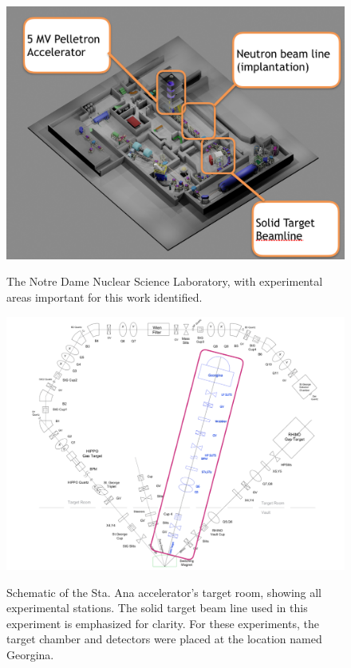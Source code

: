 \begin{figure}
\includegraphics[width=\linewidth]{figures/nslLab.png}
\label{fig: nsl}
\caption{The Notre Dame Nuclear Science Laboratory, with experimental areas important for this work identified. }
\end{figure}

\begin{figure}
\includegraphics[width=\linewidth]{figures/targetRoom.pdf}
\label{fig: targetRoom}
\caption{Schematic of the Sta. Ana accelerator's target room, showing all experimental stations. The solid target beam line used in this experiment is emphasized for clarity. For these experiments, the target chamber and detectors were placed at the location named Georgina. } 
\end{figure}


